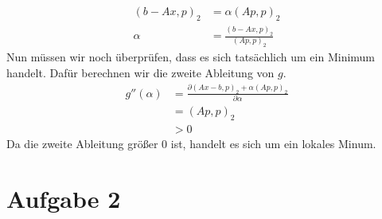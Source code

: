 \documentclass{article}
\theoremstyle{definition}
\newcommand{\pdv}[2]{\frac{\partial #1}{\partial #2}}
\begin{document}
\begin{enumerate}
\begin{align*}
        (b - Ax, p)_2 &= \alpha (Ap,p)_2\\
        \alpha &= \frac{(b - Ax, p)_2}{(Ap,p)_2}
    \end{align*}
    Nun müssen wir noch überprüfen, dass es sich tatsächlich um ein Minimum handelt. Dafür berechnen wir die zweite Ableitung von $g$.
    \begin{align*}
        g''(\alpha) &= \pdv{(Ax - b, p)_2 + \alpha (Ap,p)_2}{\alpha}\\
        &= (Ap,p)_2\\
        &> 0
    \end{align*}
    Da die zweite Ableitung größer 0 ist, handelt es sich um ein lokales Minum.
\end{enumerate}
\section*{Aufgabe 2}
\end{document}
